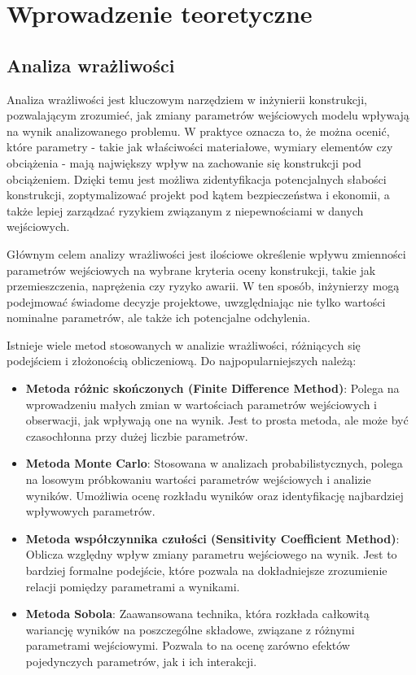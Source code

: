 \section{Wprowadzenie teoretyczne}

\subsection{Analiza wrażliwości}

Analiza wrażliwości jest kluczowym narzędziem w inżynierii konstrukcji, pozwalającym zrozumieć, jak zmiany parametrów wejściowych modelu wpływają na wynik analizowanego problemu.
W praktyce oznacza to, że można ocenić, które parametry - takie jak właściwości materiałowe, wymiary elementów czy obciążenia - mają największy wpływ na zachowanie się konstrukcji pod obciążeniem.
Dzięki temu jest możliwa zidentyfikacja potencjalnych słabości konstrukcji, zoptymalizować projekt pod kątem bezpieczeństwa i ekonomii, a także lepiej zarządzać ryzykiem związanym z niepewnościami w danych wejściowych.

Głównym celem analizy wrażliwości jest ilościowe określenie wpływu zmienności parametrów wejściowych na wybrane kryteria oceny konstrukcji, takie jak przemieszczenia, naprężenia czy ryzyko awarii.
W ten sposób, inżynierzy mogą podejmować świadome decyzje projektowe, uwzględniając nie tylko wartości nominalne parametrów, ale także ich potencjalne odchylenia.

Istnieje wiele metod stosowanych w analizie wrażliwości, różniących się podejściem i złożonością obliczeniową.
Do najpopularniejszych należą:

\begin{itemize}
    \item \textbf{Metoda różnic skończonych (Finite Difference Method)}: Polega na wprowadzeniu małych zmian w wartościach parametrów wejściowych i obserwacji, jak wpływają one na wynik. Jest to prosta metoda, ale może być czasochłonna przy dużej liczbie parametrów.
    \item \textbf{Metoda Monte Carlo}: Stosowana w analizach probabilistycznych, polega na losowym próbkowaniu wartości parametrów wejściowych i analizie wyników. Umożliwia ocenę rozkładu wyników oraz identyfikację najbardziej wpływowych parametrów.
    \item \textbf{Metoda współczynnika czułości (Sensitivity Coefficient Method)}: Oblicza względny wpływ zmiany parametru wejściowego na wynik. Jest to bardziej formalne podejście, które pozwala na dokładniejsze zrozumienie relacji pomiędzy parametrami a wynikami.
    \item \textbf{Metoda Sobola}: Zaawansowana technika, która rozkłada całkowitą wariancję wyników na poszczególne składowe, związane z różnymi parametrami wejściowymi. Pozwala to na ocenę zarówno efektów pojedynczych parametrów, jak i ich interakcji.
\end{itemize}


